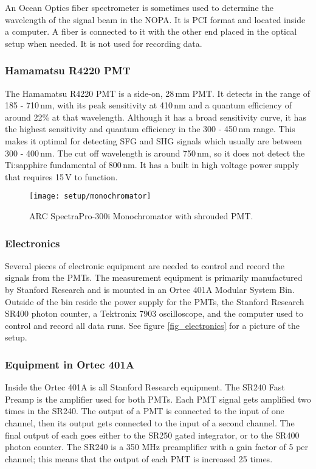 An Ocean Optics fiber spectrometer is sometimes used to determine the wavelength of the signal beam in the NOPA. It is PCI format and located inside a computer. A fiber is connected to it with the other end placed in the optical setup when needed. It is not used for recording data.

\subsubsection{Hamamatsu R4220 PMT}
The Hamamatsu R4220 PMT is a side-on, 28\,mm PMT. It detects in the range of 185 - 710\,nm, with its peak sensitivity at 410\,nm and a quantum efficiency of around 22\% at that wavelength. Although it has a broad sensitivity curve, it has the highest sensitivity and quantum efficiency in the 300 - 450\,nm range. This makes it optimal for detecting SFG and SHG signals which usually are between 300 - 400\,nm. The cut off wavelength is around 750\,nm, so it does not detect the Ti:sapphire fundamental of 800\,nm. It has a built in high voltage power supply that requires 15\,V to function. 

\begin{figure}[h]
\centering
\texttt{[image: setup/monochromator]}
\caption{ARC SpectraPro-300i Monochromator with shrouded PMT.\label{fig_monochromator}}
\end{figure}

\subsubsection{Electronics}
Several pieces of electronic equipment are needed to control and record the signals from the PMTs. The measurement equipment is primarily manufactured by Stanford Research and is mounted in an Ortec 401A Modular System Bin. Outside of the bin reside the power supply for the PMTs, the Stanford Research SR400 photon counter, a Tektronix 7903 oscilloscope, and the computer used to control and record all data runs. See figure \ref{fig_electronics} for a picture of the setup.

\subsubsection{Equipment in Ortec 401A}
Inside the Ortec 401A is all Stanford Research equipment. The SR240 Fast Preamp is the amplifier used for both PMTs. Each PMT signal gets amplified two times in the SR240. The output of a PMT is connected to the input of one channel, then its output gets connected to the input of a second channel. The final output of each goes either to the SR250 gated integrator, or to the SR400 photon counter. The SR240 is a 350 MHz preamplifier with a gain factor of 5 per channel; this means that the output of each PMT is increased 25 times.

